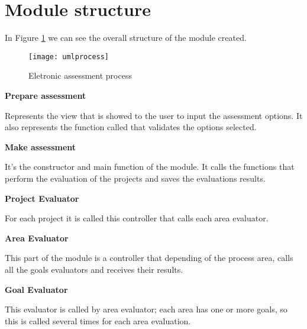 \section{Module structure}

In Figure \ref{fig:esquema} we can see the overall structure of the module created.

%
%
%
%

\begin{figure}[H]
	\begin{center}
		\leavevmode
		\texttt{[image: umlprocess]}
		\caption{Eletronic assessment process}
		\label{fig:esquema}
	\end{center}
\end{figure}


\newpage

\textbf{Prepare assessment}

Represents the view that is showed to the user to input the assessment options. It also represents the function called that validates the options selected.

\vspace{1cm}

\textbf{Make assessment}

It's the constructor and main function of the module. It calls the functions that perform the evaluation of the projects and saves the evaluations results.

\vspace{1cm}

\textbf{Project Evaluator}

For each project it is called this controller that calls each area evaluator.

\vspace{1cm}

\textbf{Area Evaluator}

This part of the module is a controller that depending of the process area, calls all the goals evaluators and receives their results.

\vspace{1cm}

\textbf{Goal Evaluator}

This evaluator is called by area evaluator; each area has one or more goals, so this is called several times for each area evaluation.

